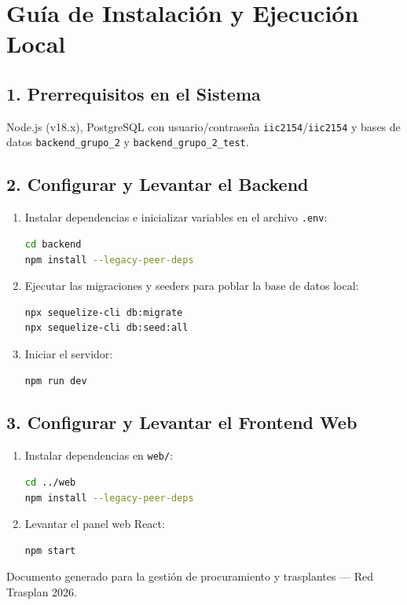 \documentclass[11pt, a4paper]{article}
\begin{document}
\newpage

\section{Guía de Instalación y Ejecución Local}

\subsection{1. Prerrequisitos en el Sistema}
Node.js (v18.x), PostgreSQL con usuario/contraseña \texttt{iic2154}/\texttt{iic2154} y bases de datos \texttt{backend\_grupo\_2} y \texttt{backend\_grupo\_2\_test}.

\subsection{2. Configurar y Levantar el Backend}
\begin{enumerate}
    \item Instalar dependencias e inicializar variables en el archivo \texttt{.env}:
\begin{lstlisting}[language=bash]
cd backend
npm install --legacy-peer-deps
\end{lstlisting}
    \item Ejecutar las migraciones y seeders para poblar la base de datos local:
\begin{lstlisting}[language=bash]
npx sequelize-cli db:migrate
npx sequelize-cli db:seed:all
\end{lstlisting}
    \item Iniciar el servidor:
\begin{lstlisting}[language=bash]
npm run dev
\end{lstlisting}
\end{enumerate}

\subsection{3. Configurar y Levantar el Frontend Web}
\begin{enumerate}
    \item Instalar dependencias en \texttt{web/}:
\begin{lstlisting}[language=bash]
cd ../web
npm install --legacy-peer-deps
\end{lstlisting}
    \item Levantar el panel web React:
\begin{lstlisting}[language=bash]
npm start
\end{lstlisting}
\end{enumerate}

\begin{center}
    \vspace{2cm}
    \small\color{gray}
    Documento generado para la gestión de procuramiento y trasplantes --- Red Trasplan 2026.
\end{center}
\end{document}
